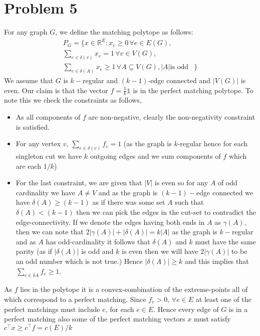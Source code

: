 \documentclass{article}
\numberwithin{equation}{section}
\newcommand{\card}[1]{\left|#1\right|}
\begin{document}
\section{Problem 5}
For any graph $G$, we define the matching polytope as follows: 
\begin{equation*}
    \begin{split}
         P_G = \biggl\{x\in \mathbb{R}^E: x_e \ge 0 \, \forall e\in E(G),&\\
         \sum_{e\in \delta(v)} x_e = 1 \, \forall v\in V(G),&\\
         \sum_{e\in \delta(A)} x_e \ge 1 \, \forall A\subseteq V(G), \card{A} \text{is odd}&\biggr\}
    \end{split}
\end{equation*}
We assume that $G$ is $k-$regular and $(k-1)$-edge connected and $\card{V(G)}$ is even. Our claim is that the vector $f = \frac{1}{k} \mathbb{1}$ is in the perfect matching polytope. To note this we check the constraints as follows, 
\begin{itemize}
    \item As all components of $f$ are non-negative, clearly the non-negativity constraint is satisfied. 
    \item For any vertex $v$, $\sum_{e\in \delta(v)} f_e = 1$ (as the graph is $k$-regular hence for each singleton cut we have $k$ outgoing edges and we sum components of $f$ which are each $1/k$)
    \item For the last constraint, we are given that $\card{V}$ is even so for any $A$ of odd cardinality we have $A\not= V$ and as the graph is $(k-1)-$edge connected we have $\delta(A) \ge (k-1)$ as if there was some set $A$ such that $\delta(A) < (k-1)$ then we can pick the edges in the cut-set to contradict the edge-connectivity. If we denote the edges having both ends in $A$ as $\gamma(A)$, then we can note that $2\card{\gamma(A)} + \card{\delta(A)} = k \card{A}$ as the graph is $k-$regular and as $A$ has odd-cardinality it follows that $\delta(A)$ and $k$ must have the same parity (as if $\card{\delta(A)}$ is odd and $k$ is even then we will have $2\card{\gamma(A)}$ to be an odd number which is not true.) Hence $\card{\delta(A)} \ge k$ and this implies that $\sum_{e\in \delta{A}} f_e \ge 1$. 
\end{itemize}
As $f$ lies in the polytope it is a convex-combination of the extreme-points all of which correspond to a perfect matching. Since $f_e>0, \, \forall e \in E$ at least one of the perfect matchings must include $e$, for each $e\in E$. Hence every edge of $G$ is in a perfect matching also some of the perfect matching vectors $x$ must satisfy $c^\top x \ge c^\top f = c(E)/k$
\end{document}
